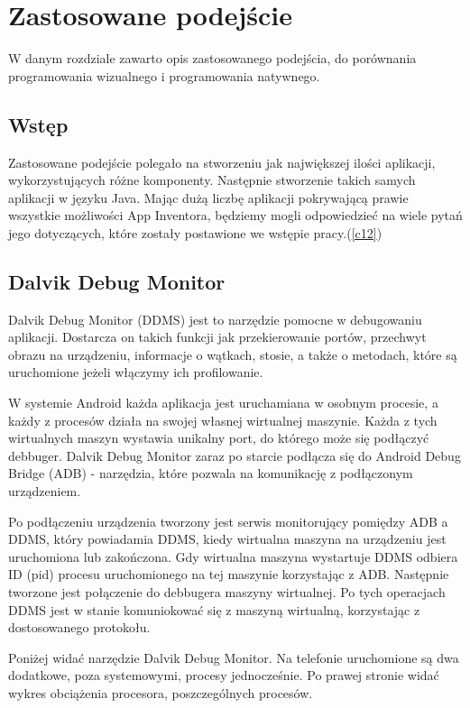 \chapter{Zastosowane podejście}
\label{c4}

W danym rozdziale zawarto opis zastosowanego podejścia, do porównania programowania wizualnego i programowania natywnego.

\section{Wstęp}
\label{c41}

Zastosowane podejście polegało na stworzeniu jak największej ilości aplikacji, wykorzystujących różne komponenty. Następnie stworzenie takich samych aplikacji w języku Java. Mając dużą liczbę aplikacji pokrywającą prawie wszystkie możliwości App Inventora, będziemy mogli odpowiedzieć na wiele pytań jego dotyczących, które zostały postawione we wstępie pracy.(\ref{c12})

\section{Dalvik Debug Monitor}

Dalvik Debug Monitor (DDMS) jest to narzędzie pomocne w debugowaniu aplikacji. Dostarcza on takich funkcji jak przekierowanie portów, przechwyt obrazu na urządzeniu, informacje o wątkach, stosie, a także o metodach, które są uruchomione jeżeli włączymy ich profilowanie.

W systemie Android każda aplikacja jest uruchamiana w osobnym procesie, a każdy z procesów działa na swojej własnej wirtualnej maszynie. Każda z tych wirtualnych maszyn wystawia unikalny port, do którego może się podłączyć debbuger. Dalvik Debug Monitor zaraz po starcie podłącza się do Android Debug Bridge (ADB) - narzędzia, które pozwala na komunikację z podłączonym urządzeniem.

Po podłączeniu urządzenia tworzony jest serwis monitorujący pomiędzy ADB a DDMS, który powiadamia DDMS, kiedy wirtualna maszyna na urządzeniu jest uruchomiona lub zakończona. Gdy wirtualna maszyna wystartuje DDMS odbiera ID (pid) procesu uruchomionego na tej maszynie korzystając z ADB. Następnie tworzone jest połączenie do debbugera maszyny wirtualnej. Po tych operacjach DDMS jest w stanie komuniokować się z maszyną wirtualną, korzystając z dostosowanego protokołu.\cite{doc:ddms}

Poniżej widać narzędzie Dalvik Debug Monitor. Na telefonie uruchomione są dwa dodatkowe, poza systemowymi, procesy jednocześnie. Po prawej stronie widać wykres obciążenia procesora, poszczególnych procesów.


